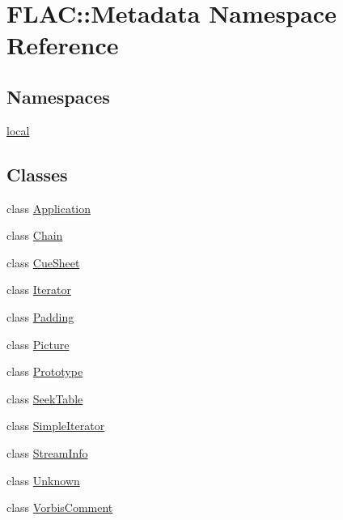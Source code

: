 \hypertarget{namespace_f_l_a_c_1_1_metadata}{}\section{F\+L\+AC\+:\+:Metadata Namespace Reference}
\label{namespace_f_l_a_c_1_1_metadata}
\subsection*{Namespaces}
\begin{DoxyCompactItemize}
\item 
 \hyperlink{namespace_f_l_a_c_1_1_metadata_1_1local}{local}
\end{DoxyCompactItemize}
\subsection*{Classes}
\begin{DoxyCompactItemize}
\item 
class \hyperlink{class_f_l_a_c_1_1_metadata_1_1_application}{Application}
\item 
class \hyperlink{class_f_l_a_c_1_1_metadata_1_1_chain}{Chain}
\item 
class \hyperlink{class_f_l_a_c_1_1_metadata_1_1_cue_sheet}{Cue\+Sheet}
\item 
class \hyperlink{class_f_l_a_c_1_1_metadata_1_1_iterator}{Iterator}
\item 
class \hyperlink{class_f_l_a_c_1_1_metadata_1_1_padding}{Padding}
\item 
class \hyperlink{class_f_l_a_c_1_1_metadata_1_1_picture}{Picture}
\item 
class \hyperlink{class_f_l_a_c_1_1_metadata_1_1_prototype}{Prototype}
\item 
class \hyperlink{class_f_l_a_c_1_1_metadata_1_1_seek_table}{Seek\+Table}
\item 
class \hyperlink{class_f_l_a_c_1_1_metadata_1_1_simple_iterator}{Simple\+Iterator}
\item 
class \hyperlink{class_f_l_a_c_1_1_metadata_1_1_stream_info}{Stream\+Info}
\item 
class \hyperlink{class_f_l_a_c_1_1_metadata_1_1_unknown}{Unknown}
\item 
class \hyperlink{class_f_l_a_c_1_1_metadata_1_1_vorbis_comment}{Vorbis\+Comment}
\end{DoxyCompactItemize}
